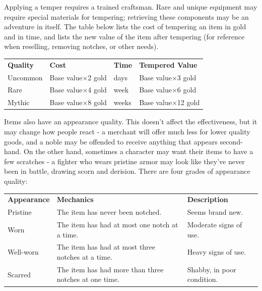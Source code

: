\documentclass[twoside]{article}
\begin{document}
\bigbreak

Applying a temper requires a trained craftsman. Rare and unique equipment may require special materials for tempering; retrieving these components may be an adventure in itself. The table below lists the cost of tempering an item in gold and in time, and lists the new value of the item after tempering (for reference when reselling, removing notches, or other needs).

\bigbreak

\begin{center}
\noindent\begin{tabular}{>{\centering\arraybackslash}p{}>{\centering\arraybackslash}p{}>{\centering\arraybackslash}p{}>{\centering\arraybackslash}p{}}
\textbf{Quality}&\textbf{Cost}&\textbf{Time}&\textbf{Tempered Value}\\
\rowcolor[gray]{0.75}Uncommon&Base value$\times$2 gold&3 days&Base value$\times$3 gold\\
Rare&Base value$\times$4 gold&1 week&Base value$\times$6 gold\\
\rowcolor[gray]{0.75}Mythic&Base value$\times$8 gold&2 weeks&Base value$\times$12 gold\\
\end{tabular}
\end{center}

\bigbreak

Items also have an appearance quality. This doesn't affect the effectiveness, but it may change how people react - a merchant will offer much less for lower quality goods, and a noble may be offended to receive anything that appears second-hand. On the other hand, sometimes a character may want their items to have a few scratches - a fighter who wears pristine armor may look like they've never been in battle, drawing scorn and derision. There are four grades of appearance quality:

\bigbreak

\begin{center}
\noindent\begin{tabular}{p{}>{\centering\arraybackslash}p{}>{\centering\arraybackslash}p{}}
\textbf{Appearance}&\textbf{Mechanics}&\textbf{Description}\\
\rowcolor[gray]{0.75}Pristine&The item has never been notched.&Seems brand new.\\
Worn&The item has had at most one notch at a time.&Moderate signs of use.\\
\rowcolor[gray]{0.75}Well-worn&The item has had at most three notches at a time.&Heavy signs of use.\\
Scarred&The item has had more than three notches at one time.&Shabby, in poor condition.\\
\end{tabular}
\end{center}
\end{document}
